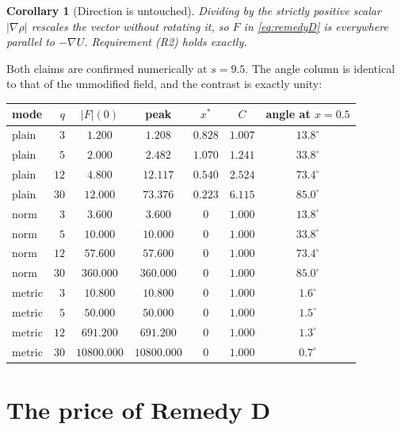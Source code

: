 \documentclass[11pt]{article}
\newtheorem{corollary}[theorem]{Corollary}
\begin{document}
\begin{corollary}[Direction is untouched]
Dividing by the strictly positive scalar $|\nabla\rho|$ rescales the vector
without rotating it, so $F$ in \eqref{eq:remedyD} is everywhere parallel to
$-\nabla U$. Requirement (R2) holds exactly.
\end{corollary}

\noindent
Both claims are confirmed numerically at $s=9.5$. The angle column is
identical to that of the unmodified field, and the contrast is exactly unity:

\begin{center}
\begin{tabular}{lrccccc}
\toprule
mode & $q$ & $|F|(0)$ & peak & $x^{*}$ & $C$ & angle at $x=0.5$\\
\midrule
plain  & $3$  & $1.200$  & $1.208$  & $0.828$ & $1.007$ & $13.8^{\circ}$\\
plain  & $5$  & $2.000$  & $2.482$  & $1.070$ & $1.241$ & $33.8^{\circ}$\\
plain  & $12$ & $4.800$  & $12.117$ & $0.540$ & $2.524$ & $73.4^{\circ}$\\
plain  & $30$ & $12.000$ & $73.376$ & $0.223$ & $6.115$ & $85.0^{\circ}$\\
\midrule
norm   & $3$  & $3.600$   & $3.600$   & $0$ & $1.000$ & $13.8^{\circ}$\\
norm   & $5$  & $10.000$  & $10.000$  & $0$ & $1.000$ & $33.8^{\circ}$\\
norm   & $12$ & $57.600$  & $57.600$  & $0$ & $1.000$ & $73.4^{\circ}$\\
norm   & $30$ & $360.000$ & $360.000$ & $0$ & $1.000$ & $85.0^{\circ}$\\
\midrule
metric & $3$  & $10.800$    & $10.800$    & $0$ & $1.000$ & $1.6^{\circ}$\\
metric & $5$  & $50.000$    & $50.000$    & $0$ & $1.000$ & $1.5^{\circ}$\\
metric & $12$ & $691.200$   & $691.200$   & $0$ & $1.000$ & $1.3^{\circ}$\\
metric & $30$ & $10800.000$ & $10800.000$ & $0$ & $1.000$ & $0.7^{\circ}$\\
\bottomrule
\end{tabular}
\end{center}

\section{The price of Remedy D}
\end{document}
